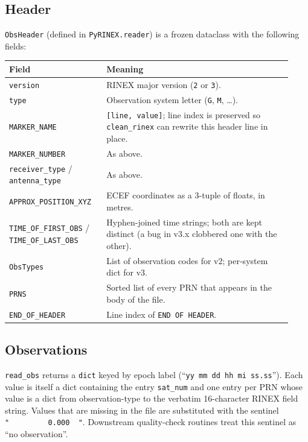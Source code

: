 \documentclass[11pt,a4paper]{article}
\begin{document}
\subsection{Header}

\texttt{ObsHeader} (defined in \texttt{PyRINEX.reader}) is a frozen
dataclass with the following fields:

\begin{longtable}{p{0.32\linewidth}p{0.61\linewidth}}
\toprule
\textbf{Field} & \textbf{Meaning} \\
\midrule
\texttt{version} & RINEX major version (\texttt{2} or \texttt{3}). \\
\texttt{type} & Observation system letter (\texttt{G}, \texttt{M}, \dots). \\
\texttt{MARKER\_NAME} & \texttt{[line, value]}; line index is preserved
so \texttt{clean\_rinex} can rewrite this header line in place. \\
\texttt{MARKER\_NUMBER} & As above. \\
\texttt{receiver\_type} / \texttt{antenna\_type} & As above. \\
\texttt{APPROX\_POSITION\_XYZ} & ECEF coordinates as a 3-tuple of
floats, in metres. \\
\texttt{TIME\_OF\_FIRST\_OBS} / \texttt{TIME\_OF\_LAST\_OBS} & Hyphen-joined
time strings; both are kept distinct (a bug in v3.x clobbered
one with the other). \\
\texttt{ObsTypes} & List of observation codes for v2; per-system
dict for v3. \\
\texttt{PRNS} & Sorted list of every PRN that appears in the body of
the file. \\
\texttt{END\_OF\_HEADER} & Line index of \texttt{END OF HEADER}. \\
\bottomrule
\end{longtable}

\subsection{Observations}

\texttt{read\_obs} returns a \texttt{dict} keyed by epoch label
(``\texttt{yy~mm~dd~hh~mi~ss.ss}''). Each value is itself a dict
containing the entry \texttt{sat\_num} and one entry per PRN whose
value is a dict from observation-type to the verbatim 16-character
RINEX field string. Values that are missing in the file are
substituted with the sentinel \texttt{"~~~~~~~~~0.000~~"}. Downstream
quality-check routines treat this sentinel as ``no observation''.
\end{document}
